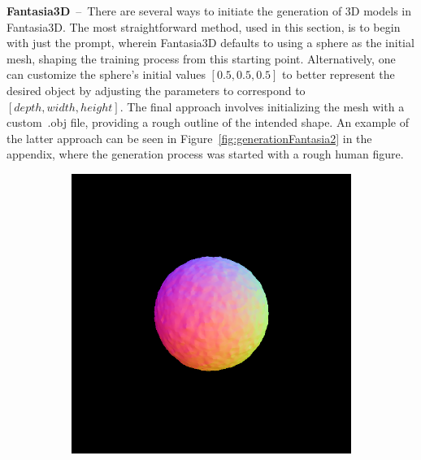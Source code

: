 \indent\textbf{Fantasia3D}~--~There are several ways to initiate the generation of 3D models in Fantasia3D. The most straightforward method, used in this section, is to begin with just the prompt, wherein Fantasia3D defaults to using a sphere as the initial mesh, shaping the training process from this starting point. Alternatively, one can customize the sphere's initial values  \([0.5, 0.5, 0.5]\) to better represent the desired object by adjusting the parameters to correspond to \([depth, width, height]\). The final approach involves initializing the mesh with a custom~.obj file, providing a rough outline of the intended shape. An example of the latter approach can be seen in Figure~\ref{fig:generationFantasia2} in the appendix, where the generation process was started with a rough human figure.

\begin{figure}[H]
    \centering
    \begin{subfigure}[b]{0.20\textwidth}
        \centering
        \fontsize{9pt}{7pt}\selectfont{}\vspace{3cm}
        \fontsize{9pt}{7pt}\selectfont{}\vspace{2.85cm}
        \fontsize{9pt}{7pt}\selectfont{}\vspace{1.95cm}
    \end{subfigure}
    \begin{subfigure}[b]{0.20\textwidth}
        \centering
        \includegraphics[width=\textwidth]{figures/generationProcess/fantasia_coarse_robot_0_part2.png}

\end{subfigure}
\end{figure}
